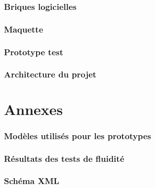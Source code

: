 \documentclass[paper=a4, fontsize=11pt]{article}
\numberwithin{equation}{section}		%
\numberwithin{figure}{section}			%
\numberwithin{table}{section}				%
\begin{document}
\section{Briques logicielles}

\section{Maquette}

\section{Prototype test}\label{sec:prototypetest}

\section{Architecture du projet}\label{sec:archi}


\appendix
\part*{Annexes}
\section{Modèles utilisés pour les prototypes} \label{annexe:modeles}

\section{Résultats des tests de fluidité} \label{annexe:fluidite}


\newpage

\section{Schéma XML}


\newpage



\end{document}
